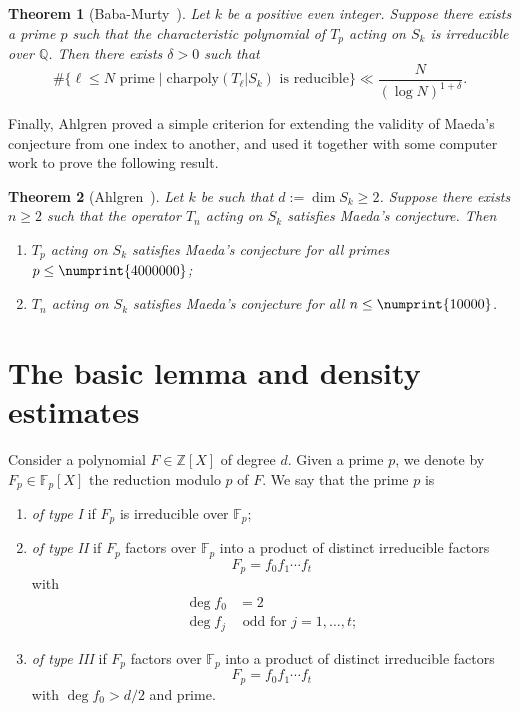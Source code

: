 \documentclass[11pt]{article}
\theoremstyle{plain}
\newtheorem{theorem}{Theorem}[section]
\theoremstyle{definition}
\theoremstyle{remark}
\numberwithin{equation}{section}
\newcommand{\ZZ}{\mathbb{Z}}
\newcommand{\FF}{\mathbb{F}}
\newcommand{\QQ}{\mathbb{Q}}
\begin{document}
\begin{theorem}[Baba-Murty~\cite{BabaMurty}]
  Let $k$ be a positive even integer.  Suppose there exists a prime $p$ such
  that the characteristic polynomial of $T_p$ acting on $S_k$ is irreducible
  over $\QQ$.  Then there exists $\delta>0$ such that
  \begin{equation*}
    \#\{\ell\leq N\text{ prime}\mid \text{charpoly}(T_\ell|S_k)\text{ is reducible}\}
    \ll \frac{N}{(\log N)^{1+\delta}}.
  \end{equation*}
\end{theorem}

Finally, Ahlgren proved a simple criterion for extending the validity of
Maeda's conjecture from one index to another, and used it together with some
computer work to prove the following result.

\begin{theorem}[Ahlgren~\cite{Ahlgren}]\label{thm:Ahl}
  Let $k$ be such that $d:=\dim S_k\geq 2$.  Suppose there exists $n\geq 2$
  such that the operator $T_n$ acting on $S_k$ satisfies Maeda's conjecture.
  Then
  \begin{enumerate}
    \item $T_p$ acting on $S_k$ satisfies Maeda's conjecture for all primes
      $p\leq\numprint{4000000}$;
    \item $T_n$ acting on $S_k$ satisfies Maeda's conjecture for all
      $n\leq\numprint{10000}$.
  \end{enumerate}
\end{theorem}




\section{The basic lemma and density estimates}
\label{sect:density}

Consider a polynomial $F\in\ZZ[X]$ of degree $d$.
Given a prime $p$, we denote by
$F_p\in\FF_p[X]$ the reduction modulo $p$ of $F$.  We say that the prime
$p$ is
\begin{enumerate}
  \item \emph{of type I} if $F_p$ is irreducible over $\FF_p$;
  \item \emph{of type II} if $F_p$ factors over $\FF_p$ into a product of
    distinct irreducible factors
    \begin{equation*}
      F_p=f_0f_1\cdots f_t
    \end{equation*}
    with
    \begin{align*}
      \deg f_0 &= 2\\
      \deg f_j &\text{ odd for }j=1,\ldots,t;
    \end{align*}
  \item \emph{of type III} if $F_p$ factors over $\FF_p$ into a product of
    distinct irreducible factors
    \begin{equation*}
      F_p=f_0f_1\cdots f_t
    \end{equation*}
    with $\deg f_0>d/2$ and prime.
\end{enumerate}
\end{document}
